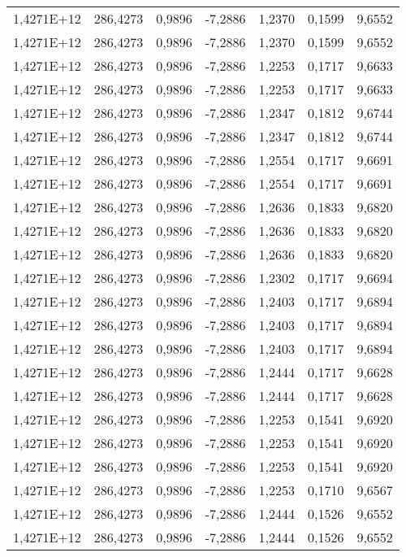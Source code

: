 \begin{table}[htbp]
\begin{tabular}{rrrrrrr}
    1,4271E+12 & 286,4273 & 0,9896 & -7,2886 & 1,2370 & 0,1599 & 9,6552 \\
    1,4271E+12 & 286,4273 & 0,9896 & -7,2886 & 1,2370 & 0,1599 & 9,6552 \\
    1,4271E+12 & 286,4273 & 0,9896 & -7,2886 & 1,2253 & 0,1717 & 9,6633 \\
    1,4271E+12 & 286,4273 & 0,9896 & -7,2886 & 1,2253 & 0,1717 & 9,6633 \\
    1,4271E+12 & 286,4273 & 0,9896 & -7,2886 & 1,2347 & 0,1812 & 9,6744 \\
    1,4271E+12 & 286,4273 & 0,9896 & -7,2886 & 1,2347 & 0,1812 & 9,6744 \\
    1,4271E+12 & 286,4273 & 0,9896 & -7,2886 & 1,2554 & 0,1717 & 9,6691 \\
    1,4271E+12 & 286,4273 & 0,9896 & -7,2886 & 1,2554 & 0,1717 & 9,6691 \\
    1,4271E+12 & 286,4273 & 0,9896 & -7,2886 & 1,2636 & 0,1833 & 9,6820 \\
    1,4271E+12 & 286,4273 & 0,9896 & -7,2886 & 1,2636 & 0,1833 & 9,6820 \\
    1,4271E+12 & 286,4273 & 0,9896 & -7,2886 & 1,2636 & 0,1833 & 9,6820 \\
    1,4271E+12 & 286,4273 & 0,9896 & -7,2886 & 1,2302 & 0,1717 & 9,6694 \\
    1,4271E+12 & 286,4273 & 0,9896 & -7,2886 & 1,2403 & 0,1717 & 9,6894 \\
    1,4271E+12 & 286,4273 & 0,9896 & -7,2886 & 1,2403 & 0,1717 & 9,6894 \\
    1,4271E+12 & 286,4273 & 0,9896 & -7,2886 & 1,2403 & 0,1717 & 9,6894 \\
    1,4271E+12 & 286,4273 & 0,9896 & -7,2886 & 1,2444 & 0,1717 & 9,6628 \\
    1,4271E+12 & 286,4273 & 0,9896 & -7,2886 & 1,2444 & 0,1717 & 9,6628 \\
    1,4271E+12 & 286,4273 & 0,9896 & -7,2886 & 1,2253 & 0,1541 & 9,6920 \\
    1,4271E+12 & 286,4273 & 0,9896 & -7,2886 & 1,2253 & 0,1541 & 9,6920 \\
    1,4271E+12 & 286,4273 & 0,9896 & -7,2886 & 1,2253 & 0,1541 & 9,6920 \\
    1,4271E+12 & 286,4273 & 0,9896 & -7,2886 & 1,2253 & 0,1710 & 9,6567 \\
    1,4271E+12 & 286,4273 & 0,9896 & -7,2886 & 1,2444 & 0,1526 & 9,6552 \\
    1,4271E+12 & 286,4273 & 0,9896 & -7,2886 & 1,2444 & 0,1526 & 9,6552 \\

\end{tabular}
\end{table}
